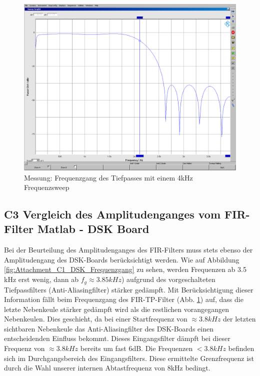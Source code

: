 \clearpage

\begin{figure}[h]
	\centering
	\includegraphics[width=1\linewidth]{Bilder/Attachment_C2_TP_Fg}
	\caption{Messung: Frequenzgang des Tiefpasses mit einem 4kHz Frequenzsweep}
	\label{fig:Attachment_C2_TP_Fg}
\end{figure}

\subsection{C3 Vergleich des Amplitudenganges vom FIR-Filter Matlab - DSK Board}
\noindent Bei der Beurteilung des Amplitudenganges des FIR-Filters muss stets ebenso der Amplitudengang des DSK-Boards berücksichtigt werden. Wie auf Abbildung \ref{fig:Attachment_C1_DSK_Frequenzgang} zu sehen, werden Frequenzen ab 3.5 kHz erst wenig, dann ab $f_g \approx 3.85kHz$) aufgrund des vorgeschalteten Tiefpassfilters (Anti-Aliasingfilter) stärker gedämpft. Mit Berücksichtigung dieser Information fällt beim Frequenzgang des FIR-TP-Filter (Abb. \ref{fig:Attachment_C2_TP_Fg}) auf, dass die letzte Nebenkeule stärker gedämpft wird als die restlichen vorangegangen Nebenkeulen. Dies geschieht, da bei einer Startfrequenz von $\approx3.8kHz$ der letzten sichtbaren Nebenkeule das Anti-Aliasingfilter des DSK-Boards einen entscheidenden  Einfluss bekommt. Dieses Eingangsfilter dämpft bei dieser Frequenz von $\approx3.8kHz$ bereits um fast 6dB. Die Frequenzen $<3.8kHz$ befinden sich im Durchgangsbereich des Eingangsfilters. Diese ermittelte Grenzfrequenz ist durch die Wahl unserer internen Abtastfrequenz von 8kHz bedingt.

